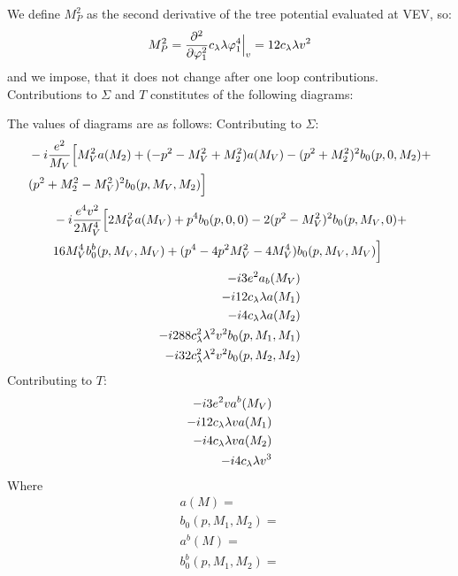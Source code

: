 We define $M_P^2$ as the second derivative of the tree potential evaluated at VEV, so:
\begin{equation}
M_P^2 = \frac{\partial^2}{\partial \varphi_1^2}c_\lambda\lambda\varphi_1^4\Big|_{v} = 12c_\lambda\lambda v^2
\end{equation}
and we impose, that it does not change after one loop contributions. \\

Contributions to $\Sigma$ and $T$ constitutes of the following diagrams:

The values of diagrams are as follows:
Contributing to $\Sigma$:
\begin{align}
&-i\frac{e^2}{M_V}\Big[M_V^2a(M_2)+(-p^2-M_V^2+M_2^2)a(M_V)-(p^2+M_2^2)^2b_0(p,0,M_2)+ 
\notag\\ 
&(p^2+M_2^2-M_V^2)^2b_0(p,M_V,M_2)\Big]
\end{align}
\begin{align}
&-i\frac{e^4v^2}{2M_V^4}\Big[2M_V^2a(M_V)+p^4b_0(p,0,0)-2(p^2-M_V^2)^2b_0(p,M_V,0)+\notag \\
&16M_V^4b_0^b(p,M_V,M_V)+(p^4-4p^2M_V^2-4M_V^4)b_0(p,M_V,M_V)\Big]
\end{align}
\begin{align}
-i3e^2a_b(M_V) \\
-i12c_\lambda\lambda a(M_1) \\
-i4c_\lambda\lambda a(M_2) \\
-i288c_\lambda^2\lambda^2v^2b_0(p,M_1,M_1) \\
-i32c_\lambda^2\lambda^2 v^2b_0(p,M_2,M_2) \\
\end{align}
Contributing to $T$:
\begin{align}
-i3e^2va^b(M_V) \\
-i12c_\lambda\lambda va(M_1) \\
-i4c_\lambda\lambda va(M_2) \\
-i4c_\lambda\lambda v^3
\end{align}
Where
\begin{align}
a(M) = \\
b_0(p,M_1,M_2) = \\
a^b(M) = \\
b_0^b(p,M_1,M_2) = 
\end{align}


